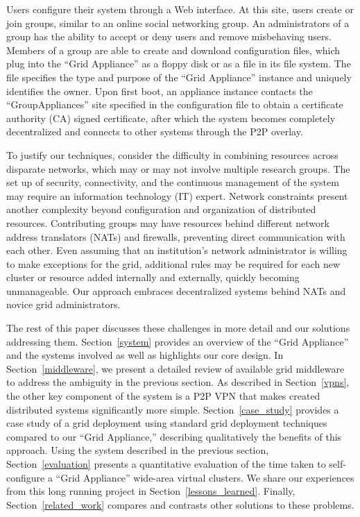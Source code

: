 \documentclass[conference]{IEEEtran}
\begin{document}
Users configure their system through a Web interface.  At this site, users
create or join groups, similar to an online social networking group.  An
administrators of a group has the ability to accept or deny users and remove
misbehaving users.  Members of a group are able to create and download
configuration files, which plug into the ``Grid Appliance'' as a floppy disk or
as a file in its file system.  The file specifies the type and purpose of the
``Grid Appliance'' instance and uniquely identifies the owner.  Upon first
boot, an appliance instance contacts the ``GroupAppliances'' site specified in
the configuration file to obtain a certificate authority (CA) signed
certificate, after which the system becomes completely decentralized and
connects to other systems through the P2P overlay.  

To justify our techniques, consider the difficulty in combining resources
across disparate networks, which may or may not involve multiple research
groups.  The set up of security, connectivity, and the continuous management of the system may require
an information technology (IT) expert.  Network constraints present another
complexity beyond configuration and organization of distributed resources.
Contributing groups may have resources behind different network address
translators (NATs) and firewalls, preventing direct communication with each
other.  Even assuming that an institution's network administrator is willing to
make exceptions for the grid, additional rules may be required for each new
cluster or resource added internally and externally, quickly becoming
unmanageable.  Our approach embraces decentralized systems behind NATs and
novice grid administrators.

The rest of this paper discusses these challenges in more detail and our
solutions addressing them.  Section~\ref{system} provides an overview of the
``Grid Appliance'' and the systems involved as well as highlights our core
design.  In Section~\ref{middleware}, we present a detailed review of available
grid middleware to address the ambiguity in the previous section.  As described
in Section~\ref{vpns}, the other key component of the system is a P2P VPN that
makes created distributed systems significantly more simple.
Section~\ref{case_study} provides a case study of a grid deployment using
standard grid deployment techniques compared to our ``Grid Appliance,''
describing qualitatively  the benefits of this approach.  Using the system
described in the previous section, Section~\ref{evaluation} presents a
quantitative evaluation of the time taken to self-configure a ``Grid
Appliance'' wide-area virtual clusters.  We share our experiences from this
long running project in Section~\ref{lessons_learned}.  Finally,
Section~\ref{related_work} compares and contrasts other solutions to these
problems.
\end{document}
